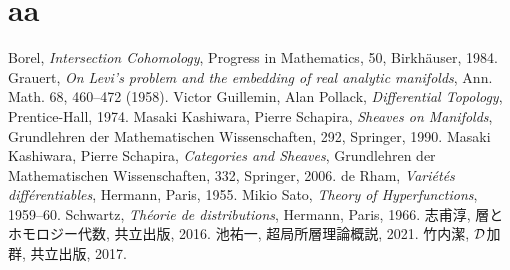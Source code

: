 \chapter{aa}
\begin{thebibliography}{20} 
     Borel, 
        \textit{Intersection Cohomology}, 
        Progress in Mathematics, 50, Birkh\"auser, 1984.
     Grauert, 
        \textit{On Levi's problem and the embedding of real analytic manifolds}, 
        Ann. Math. 68, 460--472 (1958).
     Victor Guillemin, Alan Pollack, 
        \textit{Differential Topology}, 
        Prentice-Hall, 1974.
     Masaki Kashiwara, Pierre Schapira, 
        \textit{Sheaves on Manifolds}, 
        Grundlehren der Mathematischen Wissenschaften, 292, Springer, 1990.
     Masaki Kashiwara, Pierre Schapira, 
        \textit{Categories and Sheaves}, 
        Grundlehren der Mathematischen Wissenschaften, 332, Springer, 2006.
     de Rham, 
        \textit{Vari\'et\'es diff\'erentiables}, 
        Hermann, Paris, 1955.
     Mikio Sato, 
        \textit{Theory of Hyperfunctions}, 
        1959--60.
     Schwartz, 
        \textit{Th\'eorie de distributions}, 
        Hermann, Paris, 1966.
     志甫淳, 層とホモロジー代数, 共立出版, 2016.
     池祐一, 超局所層理論概説, 2021.
     竹内潔, \(\mathcal{D}\)加群, 共立出版, 2017.
\end{thebibliography}




